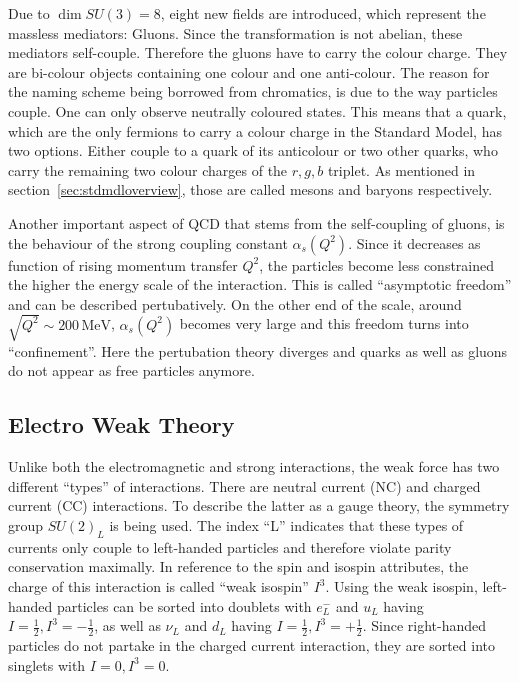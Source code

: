 \noindent Due to $\dim{SU(3)} = 8$, eight new fields are introduced, which represent the massless mediators: Gluons. Since the transformation is not abelian, these mediators self-couple. Therefore the gluons have to carry the colour charge. They are bi-colour objects containing one colour and one anti-colour. The reason for the naming scheme being borrowed from chromatics, is due to the way particles couple. One can only observe neutrally coloured states. This means that a quark, which are the only fermions to carry a colour charge in the Standard Model, has two options. Either couple to a quark of its anticolour or two other quarks, who carry the remaining two colour charges of the $r,g,b$ triplet. As mentioned in section~\ref{sec:stdmdloverview}, those are called mesons and baryons respectively.

Another important aspect of QCD that stems from the self-coupling of gluons, is the behaviour of the strong coupling constant $\alpha_s(Q^2)$. Since it decreases as function of rising momentum transfer $Q^2$, the particles become less constrained the higher the energy scale of the interaction. This is called ``asymptotic freedom'' and can be described pertubatively. On the other end of the scale, around $\sqrt{Q^2} \sim 200\,\text{MeV}$, $\alpha_s(Q^2)$ becomes very large and this freedom turns into ``confinement''. Here the pertubation theory diverges and quarks as well as gluons do not appear as free particles anymore.

\subsection{Electro Weak Theory}

Unlike both the electromagnetic and strong interactions, the weak force has two different ``types'' of interactions. There are neutral current (NC) and charged current (CC) interactions. To describe the latter as a gauge theory, the symmetry group $SU(2)_L$ is being used. The index ``L'' indicates that these types of currents only couple to left-handed particles and therefore violate parity conservation maximally. In reference to the spin and isospin attributes, the charge of this interaction is called ``weak isospin'' $I^3$. Using the weak isospin, left-handed particles can be sorted into doublets with $e^-_L$ and $u_L$ having $I = \frac{1}{2}, I^3 = -\frac{1}{2}$, as well as $\nu_L$ and $d_L$ having $I = \frac{1}{2}, I^3 = +\frac{1}{2}$. Since right-handed particles do not partake in the charged current interaction, they are sorted into singlets with $I = 0, I^3 = 0$.

